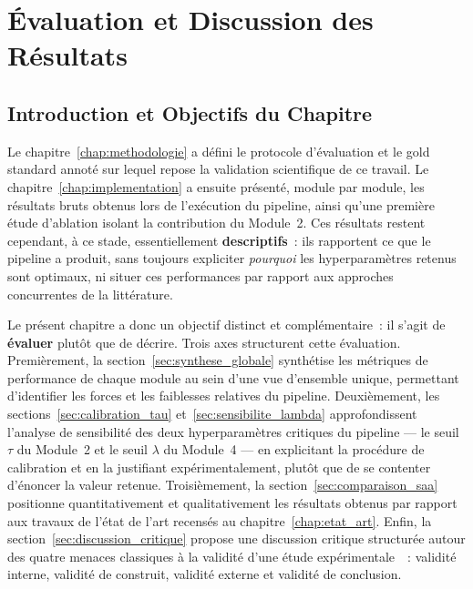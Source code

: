 \chapter{Évaluation et Discussion des Résultats}
\label{chap:evaluation}

\section{Introduction et Objectifs du Chapitre}
\label{sec:chap4_intro}

Le chapitre~\ref{chap:methodologie} a défini le protocole d'évaluation et
le gold standard annoté sur lequel repose la validation scientifique de
ce travail. Le chapitre~\ref{chap:implementation} a ensuite présenté, module
par module, les résultats bruts obtenus lors de l'exécution du pipeline,
ainsi qu'une première étude d'ablation isolant la contribution du Module~2.
Ces résultats restent cependant, à ce stade, essentiellement
\textbf{descriptifs}~: ils rapportent ce que le pipeline a produit, sans
toujours expliciter \textit{pourquoi} les hyperparamètres retenus sont
optimaux, ni situer ces performances par rapport aux approches
concurrentes de la littérature.

Le présent chapitre a donc un objectif distinct et complémentaire~: il
s'agit de \textbf{évaluer} plutôt que de décrire. Trois axes structurent
cette évaluation. Premièrement, la section~\ref{sec:synthese_globale}
synthétise les métriques de performance de chaque module au sein d'une
vue d'ensemble unique, permettant d'identifier les forces et les
faiblesses relatives du pipeline. Deuxièmement, les
sections~\ref{sec:calibration_tau} et~\ref{sec:sensibilite_lambda}
approfondissent l'analyse de sensibilité des deux hyperparamètres
critiques du pipeline --- le seuil $\tau$ du Module~2 et le seuil
$\lambda$ du Module~4 --- en explicitant la procédure de calibration et
en la justifiant expérimentalement, plutôt que de se contenter d'énoncer
la valeur retenue. Troisièmement, la section~\ref{sec:comparaison_saa}
positionne quantitativement et qualitativement les résultats obtenus par
rapport aux travaux de l'état de l'art recensés au
chapitre~\ref{chap:etat_art}. Enfin, la
section~\ref{sec:discussion_critique} propose une discussion critique
structurée autour des quatre menaces classiques à la validité d'une
étude expérimentale~\cite{wohlin2012experimentation}~: validité interne,
validité de construit, validité externe et validité de conclusion.

